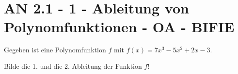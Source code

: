 \section{AN 2.1 - 1 - Ableitung von Polynomfunktionen - OA - BIFIE}

\begin{beispiel}[AN 2.1]{1} %
				Gegeben ist eine Polynomfunktion $f$ mit $f(x)=7x^3-5x^2+2x-3$.

Bilde die 1. und die 2. Ableitung der Funktion $f$!
\leer

\end{beispiel}